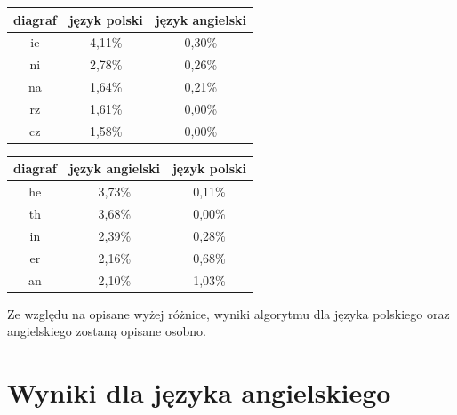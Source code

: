\documentclass{xmgr}
\begin{document}
\begin{tabular}{ c | c | c }
  diagraf & język polski & język angielski \\
  \hline
  ie &	4,11\% &	0,30\% \\
  ni &	2,78\% &	0,26\% \\
  na &	1,64\% &	0,21\% \\
  rz &	1,61\% &	0,00\% \\
  cz &	1,58\% &	0,00\% \\
\end{tabular}
\begin{tabular}{ c | c | c }
  diagraf & język angielski & język polski \\
  \hline
  he &	3,73\% &	0,11\% \\
  th &	3,68\% &	0,00\% \\
  in &	2,39\% &	0,28\% \\
  er &	2,16\% &	0,68\% \\
  an &	2,10\% &	1,03\% \\
\end{tabular}\newline\newline

Ze względu na opisane wyżej różnice, wyniki algorytmu dla języka polskiego oraz angielskiego zostaną opisane osobno.


\section{Wyniki dla języka angielskiego}
\end{document}
